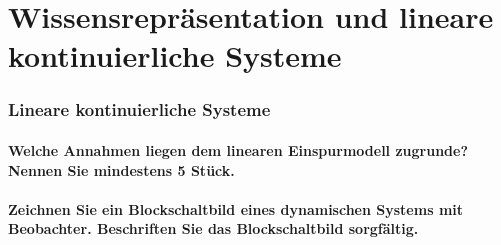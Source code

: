 \part{Wissensrepräsentation und lineare kontinuierliche Systeme}
\section{Lineare kontinuierliche Systeme}
\subsection{Welche Annahmen liegen dem linearen Einspurmodell zugrunde? Nennen Sie mindestens 5 Stück.}
\subsection{Zeichnen Sie ein Blockschaltbild eines dynamischen Systems mit Beobachter. Beschriften Sie das
Blockschaltbild sorgfältig.}